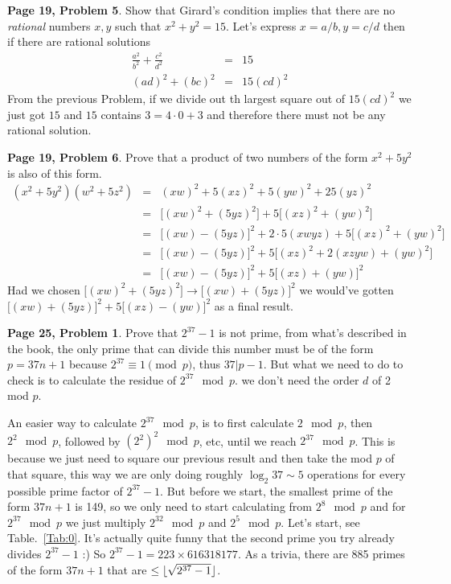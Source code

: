 \documentclass[aps,preprint,preprintnumbers,nofootinbib,showpacs,prd]{revtex4-1}
\newcommand{\nbea}{\begin{eqnarray*}}
\newcommand{\neea}{\end{eqnarray*}}
\DeclarePairedDelimiter{\floor}{\lfloor}{\rfloor}
\begin{document}
{\bf Page 19, Problem 5}. Show that Girard's condition implies that there are no {\it rational} numbers $x,y$ such that $x^2 + y^2 = 15$. Let's express $x = a/b, y = c/d$ then if there are rational solutions
%
\nbea
\frac{a^2}{b^2} + \frac{c^2}{d^2} & = & 15 \\
(ad)^2 + (bc)^2 & = & 15 (cd)^2
\neea
%
From the previous Problem, if we divide out th largest square out of $15(cd)^2$ we just got $15$ and $15$ contains $3 = 4\cdot0 + 3$ and therefore there must not be any rational solution.

{\bf Page 19, Problem 6}. Prove that a product of two numbers of the form $x^2 + 5y^2$ is also of this form.
%
\nbea
(x^2 + 5y^2)(w^2 + 5z^2) & = & (xw)^2 + 5(xz)^2 + 5(yw)^2 + 25(yz)^2 \\
& = & \lbrack(xw)^2 + (5yz)^2\rbrack +  5\lbrack (xz)^2 + (yw)^2 \rbrack  \\
& = & \lbrack(xw) - (5yz)\rbrack^2 + 2\cdot5(xwyz) +  5\lbrack (xz)^2 + (yw)^2 \rbrack  \\
& = & \lbrack(xw) - (5yz)\rbrack^2 + 5\lbrack (xz)^2 + 2(xzyw) + (yw)^2 \rbrack  \\
& = & \lbrack(xw) - (5yz)\rbrack^2 + 5\lbrack (xz) + (yw) \rbrack^2
\neea
%
Had we chosen $\lbrack(xw)^2 + (5yz)^2\rbrack \to \lbrack(xw) + (5yz)\rbrack^2$ we would've gotten $\lbrack(xw) + (5yz)\rbrack^2 + 5\lbrack (xz) - (yw) \rbrack^2$ as a final result.

{\bf Page 25, Problem 1}. Prove that $2^{37}-1$ is not prime, from what's described in the book, the only prime that can divide this number must be of the form $p = 37n + 1$ because $2^{37} \equiv 1 \pmod{p}$, thus $37|p-1$. But what we need to do to check is to calculate the residue of $2^{37} \mod p$. we don't need the order $d$ of 2 mod $p$.

An easier way to calculate $2^{37} \mod p$, is to first calculate $2 \mod p$, then $2^2 \mod p$, followed by $(2^2)^2 \mod p$, etc, until we reach $2^{37} \mod p$. This is because we just need to square our previous result and then take the mod $p$ of that square, this way we are only doing roughly $\log_2 37 \sim 5$ operations for every possible prime factor of $2^{37}-1$. But before we start, the smallest prime of the form $37n + 1$ is 149, so we only need to start calculating from $2^{8} \mod p$ and for $2^{37} \mod p$ we just multiply $2^{32} \mod p$ and $2^5 \mod p$. Let's start, see Table.~\ref{Tab:0}. It's actually quite funny that the second prime you try already divides $2^{37} - 1$ :) So $2^{37} - 1 = 223 \times 616318177$. As a trivia, there are 885 primes of the form $37n + 1$ that are $\le \floor{\sqrt{2^{37}-1}}$.
\end{document}
